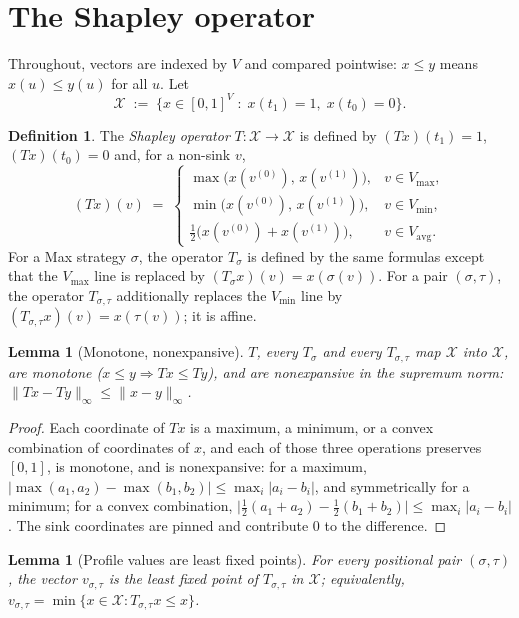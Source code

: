 \documentclass[11pt]{article}
\theoremstyle{plain}
\newtheorem{lemma}[theorem]{Lemma}
\theoremstyle{definition}
\newtheorem{definition}[theorem]{Definition}
\newcommand{\Vmax}{V_{\max}}
\newcommand{\Vmin}{V_{\min}}
\newcommand{\Vavg}{V_{\mathrm{avg}}}
\begin{document}
\section{The Shapley operator}\label{sec:operators}

Throughout, vectors are indexed by $V$ and compared pointwise: $x\le y$
means $x(u)\le y(u)$ for all $u$. Let
\[
  \mathcal{X}\;:=\;\bigl\{x\in[0,1]^V \;:\; x(t_1)=1,\; x(t_0)=0\bigr\}.
\]

\begin{definition}\label{def:shapley}
The \emph{Shapley operator} $T\colon\mathcal{X}\to\mathcal{X}$ is defined
by $(Tx)(t_1)=1$, $(Tx)(t_0)=0$ and, for a non-sink $v$,
\[
  (Tx)(v)\;=\;
  \begin{cases}
    \max\bigl(x(v^{(0)}),\,x(v^{(1)})\bigr), & v\in\Vmax,\\[2pt]
    \min\bigl(x(v^{(0)}),\,x(v^{(1)})\bigr), & v\in\Vmin,\\[2pt]
    \tfrac12\bigl(x(v^{(0)})+x(v^{(1)})\bigr), & v\in\Vavg.
  \end{cases}
\]
For a Max strategy $\sigma$, the operator $T_\sigma$ is defined by the
same formulas except that the $\Vmax$ line is replaced by
$(T_\sigma x)(v)=x(\sigma(v))$. For a pair $(\sigma,\tau)$, the operator
$T_{\sigma,\tau}$ additionally replaces the $\Vmin$ line by
$(T_{\sigma,\tau}x)(v)=x(\tau(v))$; it is affine.
\end{definition}

\begin{lemma}[Monotone, nonexpansive]\label{lem:monotone}
$T$, every $T_\sigma$ and every $T_{\sigma,\tau}$ map $\mathcal{X}$ into
$\mathcal{X}$, are monotone ($x\le y\Rightarrow Tx\le Ty$), and are
nonexpansive in the supremum norm:
$\lVert Tx-Ty\rVert_\infty\le\lVert x-y\rVert_\infty$.
\end{lemma}

\begin{proof}
Each coordinate of $Tx$ is a maximum, a minimum, or a convex combination
of coordinates of $x$, and each of those three operations preserves
$[0,1]$, is monotone, and is nonexpansive: for a maximum,
$|\max(a_1,a_2)-\max(b_1,b_2)|\le\max_i|a_i-b_i|$, and symmetrically for
a minimum; for a convex combination,
$\bigl|\tfrac12(a_1+a_2)-\tfrac12(b_1+b_2)\bigr|\le\max_i|a_i-b_i|$. The
sink coordinates are pinned and contribute $0$ to the difference.
\end{proof}

\begin{lemma}[Profile values are least fixed points]\label{lem:lfp}
For every positional pair $(\sigma,\tau)$, the vector $v_{\sigma,\tau}$
is the least fixed point of $T_{\sigma,\tau}$ in $\mathcal{X}$;
equivalently, $v_{\sigma,\tau}=\min\{x\in\mathcal{X}:T_{\sigma,\tau}x\le x\}$.
\end{lemma}
\end{document}
